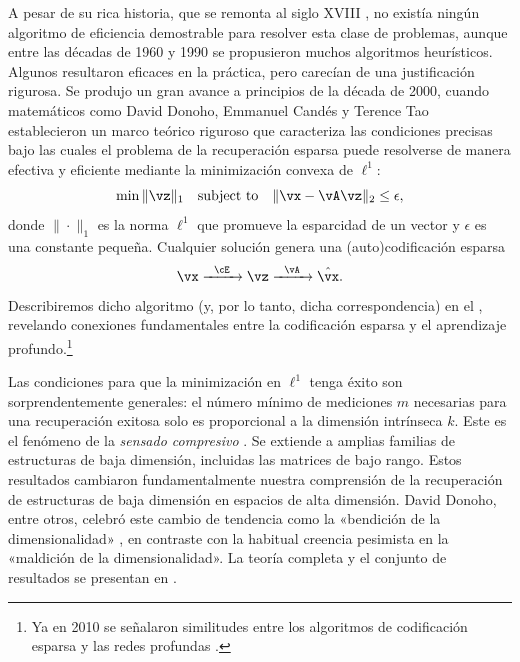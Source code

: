\documentclass[../../book-main_es.tex]{subfiles}
\begin{document}
A pesar de su rica historia, que se remonta al siglo XVIII
\cite{Boscovichca1750}, no existía ningún algoritmo de eficiencia demostrable para resolver
esta clase de problemas, aunque entre las décadas de 1960 y 1990
se propusieron muchos algoritmos heurísticos. Algunos resultaron eficaces en la práctica,
pero carecían de una justificación rigurosa. Se produjo un gran avance a
principios de la década de 2000, cuando matemáticos como David Donoho, Emmanuel
Candés y Terence Tao
\cite{donoho2005neighborly,Candes2005,CandesE2005-IT} establecieron un
marco teórico riguroso que caracteriza las condiciones precisas
bajo las cuales el problema de la recuperación esparsa puede resolverse de manera efectiva y
eficiente mediante la minimización convexa de \(\ell^{1}\):
\begin{equation}
    \min \|\vz\|_{1} \quad \text{subject to} \quad \|\vx -
    \vA\vz\|_{2} \leq \epsilon,
\end{equation}
donde \(\|\cdot\|_{1}\) es la norma \(\ell^{1}\) que promueve la esparcidad
de un vector y \(\epsilon\) es una constante pequeña. Cualquier solución genera
una (auto)codificación esparsa
\begin{equation}
    \vx \xrightarrow{\hspace{2mm} \cE \hspace{2mm}} \vz
    \xrightarrow{\hspace{2mm} \vA \hspace{2mm}} \hat{\vx}.
    \label{eqn:decoding-sparse}
\end{equation}
Describiremos dicho algoritmo (y, por lo tanto, dicha correspondencia) en el
, revelando conexiones fundamentales entre la codificación
esparsa y el aprendizaje profundo.\footnote{Ya en 2010 se señalaron similitudes 
    entre los algoritmos de codificación esparsa
    y las redes profundas
\cite{gregor2010learning}.}

Las condiciones para que la minimización en \(\ell^{1}\) tenga éxito son sorprendentemente
generales: el número mínimo de mediciones \(m\) necesarias para una
recuperación exitosa solo es proporcional a la dimensión intrínseca
\(k\). Este es el fenómeno de la \textit{sensado compresivo}
\cite{CandesE2006-ICM}. Se extiende a amplias familias de
estructuras de baja dimensión, incluidas las matrices de bajo rango. Estos
resultados cambiaron fundamentalmente nuestra comprensión de la recuperación
de estructuras de baja dimensión en espacios de alta dimensión. David Donoho,
entre otros, celebró este cambio de tendencia como la «bendición de
la dimensionalidad» \cite{DonohoD2000}, en contraste con la habitual
creencia pesimista en la «maldición de la dimensionalidad». La teoría completa
y el conjunto de resultados se presentan en \cite{Wright-Ma-2022}.
\end{document}
